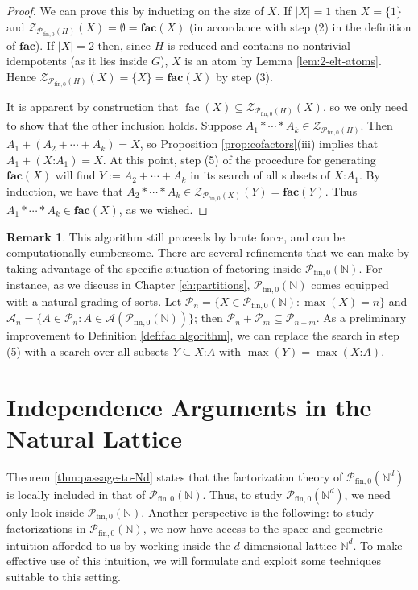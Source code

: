 \documentclass{report}
\newcommand{\A}{\mathcal{A}}
\newcommand{\NN}{\mathbb{N}}
\renewcommand{\P}{\mathcal{P}}
\newcommand{\Z}{\mathcal{Z}}
\newcommand{\fin}{\textrm{fin}}
\newcommand{\fon}{{\textrm{fin}, 0}}
\renewcommand{\:}{\text{:}}
\newcommand{\PN}{{\P_{\fin,0}(\NN)}}
\theoremstyle{definition}
\newtheorem{rk}[defn]{Remark}
\begin{document}
\begin{proof}
We can prove this by inducting on the size of $X$.
If $|X|=1$ then $X = \{1\}$ and $\Z_{\P_\fon(H)}(X) = \emptyset = \mathbf{fac}(X)$ (in accordance with step (2) in the definition of $\mathbf{fac}$).
If $|X| = 2$ then, since $H$ is reduced and contains no nontrivial idempotents (as it lies inside $G$), $X$ is an atom by Lemma \ref{lem:2-elt-atoms}.
Hence $\Z_{\P_\fon(H)}(X) = \{X\} = \mathbf{fac}(X)$ by step (3).

It is apparent by construction that $\operatorname{fac}(X) \subseteq \Z_{\P_\fon(H)}(X)$, so we only need to show that the other inclusion holds.
Suppose $A_1*\cdots*A_k \in \Z_{\P_\fon(H)}$.
Then $A_1 + (A_2 + \cdots + A_k) = X$, so Proposition \ref{prop:cofactors}(iii) implies that $A_1 + (X\:A_1) = X$.
At this point, step (5) of the procedure for generating $\mathbf{fac}(X)$ will find $Y:=A_2+\cdots+A_k$ in its search of all subsets of $X\:A_1$.
By induction, we have that $A_2*\cdots*A_k \in \Z_{\P_\fon(X)}(Y) = \mathbf{fac}(Y)$.
Thus $A_1 * \cdots * A_k \in \mathbf{fac}(X)$, as we wished.
\end{proof}

\begin{rk}
This algorithm still proceeds by brute force, and can be computationally cumbersome.  
There are several refinements that we can make by taking advantage of the specific situation of factoring inside $\PN$.
For instance, as we discuss in Chapter \ref{ch:partitions}, $\PN$ comes equipped with a natural grading of sorts.
Let $\P_n = \{X\in \PN: \max(X)=n\}$ and $\A_n = \{A\in \P_n: A\in \A(\PN)\}$; then $\P_n + \P_m \subseteq \P_{n+m}$.
As a preliminary improvement to Definition \ref{def:fac algorithm}, we can replace the search in step (5) with a search over all subsets $Y \subseteq X\:A$ with $\max(Y) = \max(X\:A)$.
\end{rk}



\section{Independence Arguments in the Natural Lattice}

Theorem \ref{thm:passage-to-Nd} states that the factorization theory of $\P_\fon(\NN^d)$ is locally included in that of $\PN$.
Thus, to study $\P_\fon(\NN^d)$, we need only look inside $\PN$. 
Another perspective is the following: to study factorizations in $\PN$, we now have access to the space and geometric intuition afforded to us by working inside the $d$-dimensional lattice $\NN^d$.
To make effective use of this intuition, we will formulate and exploit some techniques suitable to this setting.
\end{document}

